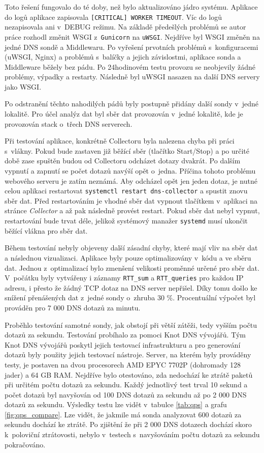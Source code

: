 \documentclass[thesis=M,czech]{src/FITthesis}[2019/12/23]
\begin{document}
Toto řešení fungovalo do té doby, než bylo aktualizováno jádro systému. Aplikace do logů aplikace zapisovala \texttt{[CRITICAL] WORKER TIMEOUT}. Víc do logů nezapisovala ani v~DEBUG režimu. Na základě předešlých problémů se autor práce rozhodl změnit WSGI z~\texttt{Gunicorn} na \texttt{uWSGI}. Nejdříve byl WSGI změněn na jedné DNS sondě a Middlewaru. Po vyřešení prvotních problémů s~konfiguracemi (uWSGI, Nginx) a problémů s~balíčky a jejich závislostmi, aplikace sonda a Middleware běžely bez pádu. Po 24hodinovém testu provozu se neobjevily žádné problémy, výpadky a restarty. Následně byl uWSGI nasazen na další DNS servery jako WSGI. 


Po odstranění těchto nahodilých pádů byly postupně přidány další sondy v~jedné lokalitě. Pro účel analýz dat byl sběr dat provozován v~jedné lokalitě, kde je provozován stack o~třech DNS serverech. 


Při testování aplikace, konkrétně Collectoru byla nalezena chyba při práci s~vlákny. Pokud bude zastaven již běžící sběr (tlačítko Start/Stop) a po určité době zase spuštěn budou od Collectoru odcházet dotazy dvakrát. Po dalším vypnutí a zapnutí se počet dotazů navýší opět o~jedna. Příčina tohoto problému webového serveru je zatím neznámá. Aby odcházel opět jen jeden dotaz, je nutné celou aplikaci restartovat \texttt{systemctl restart dns-collector} a spustit znovu sběr dat. Před restartováním je vhodné sběr dat vypnout tlačítkem v~aplikaci na stránce \textit{Collector} a až pak následně provést restart. Pokud sběr dat nebyl vypnut, restartování bude trvat déle, jelikož systémový manažer \texttt{systemd} musí ukončit běžící vlákna pro sběr dat. 

Během testování nebyly objeveny další zásadní chyby, které mají vliv na sběr dat a následnou vizualizaci. Aplikace byly pouze optimalizovány v~kódu a ve sběru dat. Jednou z~optimalizací bylo zmenšení velikosti proměnné určené pro sběr dat. V~počátku byly vytvářeny i záznamy \texttt{RTT\_sum} a \texttt{RTT\_queries} pro každou IP adresu, i přesto že žádný TCP dotaz na DNS server nepřišel. Díky tomu došlo ke snížení přenášených dat z~jedné sondy o~zhruba 30 \%. Procentuální výpočet byl prováděn pro 7 000 DNS dotazů za minutu.


Proběhlo testování samotné sondy, jak obstojí při větší zátěži, tedy vyšším počtu dotazů za sekundu. Testování probíhalo za pomoci Knot DNS vývojářů. Tým Knot DNS vývojářů poskytl  jejich testovací infrastrukturu a pro generování dotazů byly použity jejich testovací nástroje. Server, na kterém byly prováděny testy, je postaven na dvou procesorech AMD EPYC 7702P (dohromady 128 jader) a 64 GB RAM. Nejdříve bylo otestováno, zda nedochází ke ztrátě paketů při určitém počtu dotazů za sekundu. Každý jednotlivý test trval 10 sekund a počet dotazů byl navyšován od 100 DNS dotazů za sekundu až po 2 000 DNS dotazů za sekundu. Výsledky testu lze vidět v~tabulce \ref{tab:qps} a grafu \ref{fig:qps_compare}. Lze vidět, že jakmile má sonda analyzovat 600 dotazů za sekundu dochází ke ztrátě. Po zjištění že při 2 000 DNS dotazech dochází skoro k~poloviční ztrátovosti, nebylo v~testech s~navyšováním počtu dotazů za sekundu pokračováno.
\end{document}

